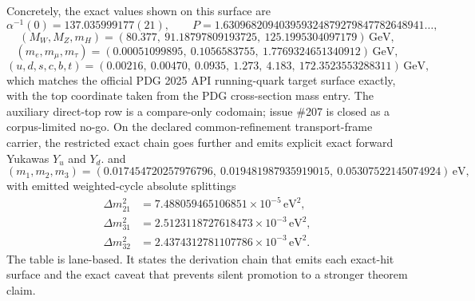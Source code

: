 \documentclass[11pt]{article}
\begin{document}
Concretely, the exact values shown on this surface are
\[
\alpha^{-1}(0)=137.035999177(21),
\qquad
P=1.630968209403959324879279847782648941\ldots,
\]
\[
(M_W,M_Z,m_H)=
(80.377,\ 91.18797809193725,\ 125.1995304097179)\,\mathrm{GeV},
\]
\[
(m_e,m_\mu,m_\tau)=
(0.00051099895,\ 0.1056583755,\ 1.7769324651340912)\,\mathrm{GeV},
\]
\[
(u,d,s,c,b,t)=
(0.00216,\ 0.00470,\ 0.0935,\ 1.273,\ 4.183,\ 172.3523553288311)\,\mathrm{GeV},
\]
which matches the official PDG 2025 API running-quark target surface exactly, with the top coordinate taken from the PDG cross-section mass entry. The auxiliary direct-top row is a compare-only codomain; issue \#207 is closed as a corpus-limited no-go. On the declared common-refinement transport-frame carrier, the restricted exact chain goes further and emits explicit exact forward Yukawas \(Y_u\) and \(Y_d\).
and
\[
(m_1,m_2,m_3)=
(0.017454720257976796,\ 0.019481987935919015,\ 0.05307522145074924)\,\mathrm{eV},
\]
with emitted weighted-cycle absolute splittings
\[
\begin{aligned}
\Delta m_{21}^2&=7.488059465106851\times10^{-5}\,\mathrm{eV}^2,\\
\Delta m_{31}^2&=2.5123118727618473\times10^{-3}\,\mathrm{eV}^2,\\
\Delta m_{32}^2&=2.4374312781107786\times10^{-3}\,\mathrm{eV}^2.
\end{aligned}
\]
The table is lane-based. It states the derivation chain that emits each exact-hit surface and the exact caveat that prevents silent promotion to a stronger theorem claim.
\end{document}
